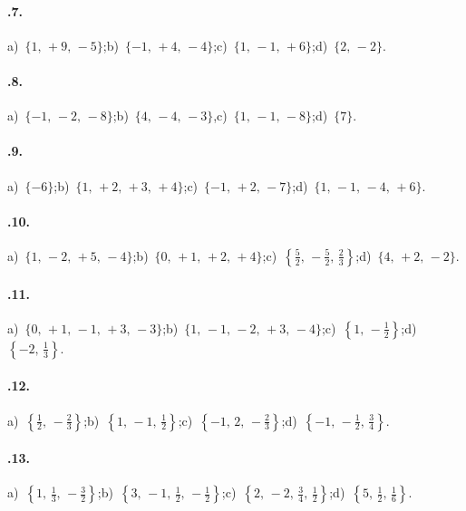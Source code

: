 \begin{multicols}{2}
\paragraph{\thechapter.7.}
a)~$\{1\text{,~}+9\text{,~}-5\}$;\quad b)~$\{-1\text{,~}+4\text{,~}-4\}$;\quad c)~$\{1\text{,~}-1\text{,~}+6\}$;\quad d)~$\{2\text{,~}-2\}$.
\paragraph{\thechapter.8.}
a)~$\{-1\text{,~}-2\text{,~}-8\}$;\quad b)~$\{4\text{,~}-4\text{,~}-3\}$,\quad c)~$\{1\text{,~}-1\text{,~}-8\}$;\quad d)~$\{7\}$.
\paragraph{\thechapter.9.}
a)~$\{-6\}$;\quad b)~$\{1\text{,~}+2\text{,~}+3\text{,~}+4\}$;\quad c)~$\{-1\text{,~}+2\text{,~}-7\}$;\quad d)~$\{1\text{,~}-1\text{,~}-4\text{,~}+6\}$.

\paragraph{\thechapter.10.}
a)~$\{1\text{,~}-2\text{,~}+5\text{,~}-4\}$;\quad b)~$\{0\text{,~}+1\text{,~}+2\text{,~}+4\}$;\quad c)~$\left\{\frac{5}{2}\text{,~}-\frac{5}{2}\text{,~}\frac{2}{3}\right\}$;\quad d)~$\{4\text{,~}+2\text{,~}-2\}$.

\paragraph{\thechapter.11.}
a)~$\{0\text{,~}+1\text{,~}-1\text{,~}+3\text{,~}-3\}$;\quad b)~$\{1\text{,~}-1\text{,~}-2\text{,~}+3\text{,~}-4\}$;\quad c)~$\left\{1\text{,~}-\frac{1}{2}\right\}$;\quad d)~$\left\{-2\text{,~}\frac{1}{3}\right\}$.

\paragraph{\thechapter.12.}
a)~$\left\{\frac{1}{2}\text{,~}-\frac{2}{3}\right\}$;\quad b)~$\left\{1\text{,~}-1\text{,~}\frac{1}{2}\right\}$;\quad c)~$\left\{-1\text{,~}2\text{,~}-\frac{2}{3}\right\}$;\quad d)~$\left\{-1\text{,~}-\frac{1}{2}\text{,~}\frac{3}{4}\right\}$.

\paragraph{\thechapter.13.}
a)~$\left\{1\text{,~}\frac{1}{3}\text{,~}-\frac{3}{2}\right\}$;\quad b)~$\left\{3\text{,~}-1\text{,~}\frac{1}{2}\text{,~}-\frac{1}{2}\right\}$;\quad c)~$\left\{2\text{,~}-2\text{,~}\frac{3}{4}\text{,~}\frac{1}{2}\right\}$;\quad d)~$\left\{5\text{,~}\frac{1}{2}\text{,~}\frac{1}{6}\right\}$.


\end{multicols}
